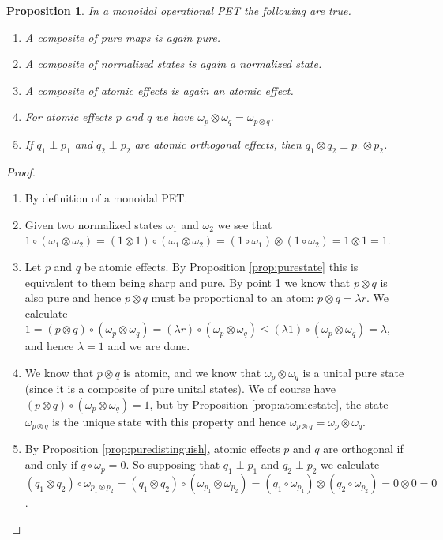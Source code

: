 \documentclass[a4paper,onecolumn,10pt,accepted=2019-05-03, issue=1, volume=1, shorttitle=papers/compositionality-1-1]{compositionalityarticle}
\newcounter{counter}
\numberwithin{counter}{section}
\newtheorem{proposition}[counter]{Proposition}
\begin{document}
\begin{proposition} \label{prop:compositeproperties}
    In a monoidal operational PET the following are true.
    \begin{enumerate}
        \item A composite of pure maps is again pure.
        \item A composite of normalized states is again a normalized state.
        \item A composite of atomic effects is again an atomic effect.
        \item For atomic effects $p$ and $q$ we have $\omega_p\otimes \omega_q = \omega_{p\otimes q}$.
        \item If $q_1\perp p_1$ and $q_2\perp p_2$ are atomic orthogonal effects, then $q_1\otimes q_2 \perp p_1\otimes p_2$.
    \end{enumerate}
\end{proposition}
\begin{proof}~
    \begin{enumerate}
        \item By definition of a monoidal PET.
        \item Given two normalized states $\omega_1$ and $\omega_2$ we see that $1\circ(\omega_1\otimes \omega_2) = (1\otimes 1)\circ(\omega_1\otimes \omega_2) = (1\circ\omega_1) \otimes (1\circ \omega_2) = 1\otimes 1 = 1$.
        \item Let $p$ and $q$ be atomic effects. By Proposition \ref{prop:purestate} this is equivalent to them being sharp and pure. By point 1 we know that $p\otimes q$ is also pure and hence $p\otimes q$ must be proportional to an atom: $p\otimes q = \lambda r$. We calculate $1 = (p\otimes q)\circ (\omega_p\otimes \omega_q) = (\lambda r)\circ (\omega_p\otimes \omega_q) \leq (\lambda 1)\circ (\omega_p\otimes \omega_q) = \lambda$, and hence $\lambda=1$ and we are done.
        \item We know that $p\otimes q$ is atomic, and we know that $\omega_p\otimes \omega_q$ is a unital pure state (since it is a composite of pure unital states). We of course have $(p\otimes q)\circ (\omega_p\otimes \omega_q) = 1$, but by Proposition \ref{prop:atomicstate}, the state $\omega_{p\otimes q}$ is the unique state with this property and hence $\omega_{p\otimes q} = \omega_p\otimes \omega_q$.
        \item By Proposition \ref{prop:puredistinguish}, atomic effects $p$ and $q$ are orthogonal if and only if $q\circ \omega_p = 0$. So supposing that $q_1\perp p_1$ and $q_2\perp p_2$ we calculate $(q_1\otimes q_2)\circ\omega_{p_1\otimes p_2} = (q_1\otimes q_2)\circ (\omega_{p_1}\otimes \omega_{p_2}) = (q_1\circ \omega_{p_1})\otimes (q_2\circ \omega_{p_2}) = 0\otimes 0 = 0$. \qedhere
    \end{enumerate}
\end{proof}
\end{document}
